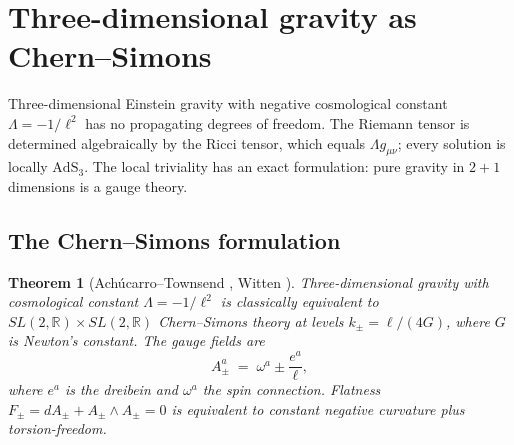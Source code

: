 \documentclass[11pt,reqno]{amsart}
\newtheorem{theorem}{Theorem}[section]
\theoremstyle{definition}
\theoremstyle{remark}
\begin{document}
\maketitle
\tableofcontents

\section{Three-dimensional gravity as Chern--Simons}
\label{sec:gravity-as-cs}

Three-dimensional Einstein gravity with negative cosmological
constant $\Lambda = -1/\ell^2$ has no propagating degrees of
freedom. The Riemann tensor is determined algebraically by the
Ricci tensor, which equals $\Lambda g_{\mu\nu}$; every solution
is locally $\mathrm{AdS}_3$. The local triviality has an exact
formulation: pure gravity in $2{+}1$ dimensions is a gauge theory.

\subsection{The Chern--Simons formulation}

\begin{theorem}[Ach\'ucarro--Townsend \cite{AT86}, Witten \cite{Wit88}]
\label{thm:cs-gravity}
Three-dimensional gravity with cosmological constant\/
$\Lambda = -1/\ell^2$ is classically equivalent to\/
$SL(2,\mathbb{R}) \times SL(2,\mathbb{R})$ Chern--Simons theory
at levels\/ $k_\pm = \ell/(4G)$, where $G$ is Newton's constant.
The gauge fields are
\begin{equation}\label{eq:cs-gauge-fields}
A_\pm^a \;=\; \omega^a \pm \frac{e^a}{\ell},
\end{equation}
where $e^a$ is the dreibein and\/ $\omega^a$ the spin connection.
Flatness $F_\pm = dA_\pm + A_\pm \wedge A_\pm = 0$ is equivalent
to constant negative curvature plus torsion-freedom.
\end{theorem}
\end{document}
